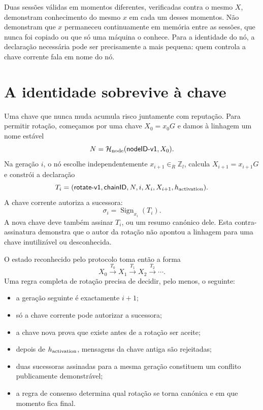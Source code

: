 Duas sessões válidas em momentos diferentes, verificadas contra o mesmo \(X\),
demonstram conhecimento do mesmo \(x\) em cada um desses momentos. Não
demonstram que \(x\) permaneceu continuamente em memória entre as sessões, que
nunca foi copiado ou que só uma máquina o conhece. Para a identidade do nó, a
declaração necessária pode ser precisamente a mais pequena: quem controla a
chave corrente fala em nome do nó.

\section{A identidade sobrevive à chave}

Uma chave que nunca muda acumula risco juntamente com reputação. Para permitir
rotação, começamos por uma chave \(X_0=x_0G\) e damos à linhagem um nome estável
\[
    N=\mathcal H_{\rm node}(\mathsf{nodeID\mbox{-}v1},X_0).
\]
Na geração \(i\), o nó escolhe independentemente
\(x_{i+1}\in_R\mathbb Z_l\), calcula \(X_{i+1}=x_{i+1}G\) e constrói a
declaração
\[
 T_i=(\mathsf{rotate\mbox{-}v1},\mathsf{chainID},N,i,
          X_i,X_{i+1},h_{\rm activation}).
\]
A chave corrente autoriza a sucessora:
\[
    \sigma_i=\operatorname{Sign}_{x_i}(T_i).
\]
A nova chave deve também assinar \(T_i\), ou um resumo canónico dele. Esta
contra-assinatura demonstra que o autor da rotação não apontou a linhagem para
uma chave inutilizável ou desconhecida.

O estado reconhecido pelo protocolo toma então a forma
\[
 X_0\xrightarrow{\,T_0\,}X_1
    \xrightarrow{\,T_1\,}X_2
    \xrightarrow{\,T_2\,}\cdots .
\]
Uma regra completa de rotação precisa de decidir, pelo menos, o seguinte:
\begin{itemize}
    \item a geração seguinte é exactamente \(i+1\);
    \item só a chave corrente pode autorizar a sucessora;
    \item a chave nova prova que existe antes de a rotação ser aceite;
    \item depois de \(h_{\rm activation}\), mensagens da chave antiga são
          rejeitadas;
    \item duas sucessoras assinadas para a mesma geração constituem um conflito
          publicamente demonstrável;
    \item a regra de consenso determina qual rotação se torna canónica e em
          que momento fica final.
\end{itemize}

